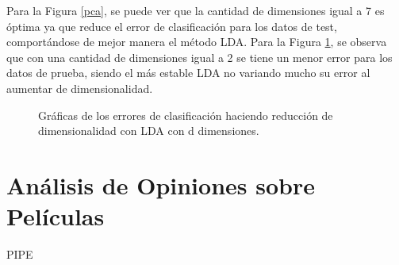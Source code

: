 \documentclass[letter, 10pt]{article}
\begin{document}
Para la Figura \ref{pca}, se puede ver que la cantidad de dimensiones igual a 7 es óptima ya que reduce el error de clasificación para los datos de test, comportándose de mejor manera el método LDA. Para la Figura \ref{lda}, se observa que con una cantidad de dimensiones igual a 2 se tiene un menor error para los datos de prueba, siendo el más estable LDA no variando mucho su error al aumentar de dimensionalidad.\\

\begin{figure}[h]
\begin{center}
\caption{Gráficas de los errores de clasificación haciendo reducción de dimensionalidad con LDA con d dimensiones.} 
\label{lda}
\end{center}
\end{figure}

\section{Análisis de Opiniones sobre Películas}

PIPE
\end{document}
